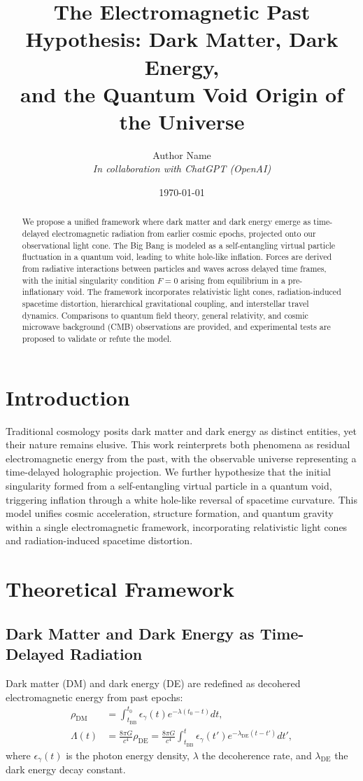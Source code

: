 \documentclass{article}
\title{The Electromagnetic Past Hypothesis: Dark Matter, Dark Energy, \\ and the Quantum Void Origin of the Universe}
\author{Author Name \\ \textit{In collaboration with ChatGPT (OpenAI)}}
\date{\today}
\begin{document}
\maketitle

\begin{abstract}
We propose a unified framework where dark matter and dark energy emerge as time-delayed electromagnetic radiation from earlier cosmic epochs, projected onto our observational light cone. The Big Bang is modeled as a self-entangling virtual particle fluctuation in a quantum void, leading to white hole-like inflation. Forces are derived from radiative interactions between particles and waves across delayed time frames, with the initial singularity condition \( F = 0 \) arising from equilibrium in a pre-inflationary void. The framework incorporates relativistic light cones, radiation-induced spacetime distortion, hierarchical gravitational coupling, and interstellar travel dynamics. Comparisons to quantum field theory, general relativity, and cosmic microwave background (CMB) observations are provided, and experimental tests are proposed to validate or refute the model.
\end{abstract}

\section{Introduction}
Traditional cosmology posits dark matter and dark energy as distinct entities, yet their nature remains elusive. This work reinterprets both phenomena as residual electromagnetic energy from the past, with the observable universe representing a time-delayed holographic projection. We further hypothesize that the initial singularity formed from a self-entangling virtual particle in a quantum void, triggering inflation through a white hole-like reversal of spacetime curvature. This model unifies cosmic acceleration, structure formation, and quantum gravity within a single electromagnetic framework, incorporating relativistic light cones and radiation-induced spacetime distortion.

\section{Theoretical Framework}
\subsection{Dark Matter and Dark Energy as Time-Delayed Radiation}
Dark matter (DM) and dark energy (DE) are redefined as decohered electromagnetic energy from past epochs:
\begin{align}
\rho_{\text{DM}} &= \int_{t_{\text{BB}}}^{t_0} \epsilon_{\gamma}(t) e^{-\lambda (t_0 - t)} dt, \label{eq:dm} \\
\Lambda(t) &= \frac{8\pi G}{c^4} \rho_{\text{DE}} = \frac{8\pi G}{c^4} \int_{t_{\text{BB}}}^{t} \epsilon_{\gamma}(t') e^{-\lambda_{\text{DE}} (t - t')} dt', \label{eq:de}
\end{align}
where \( \epsilon_{\gamma}(t) \) is the photon energy density, \( \lambda \) the decoherence rate, and \( \lambda_{\text{DE}} \) the dark energy decay constant.
\end{document}
